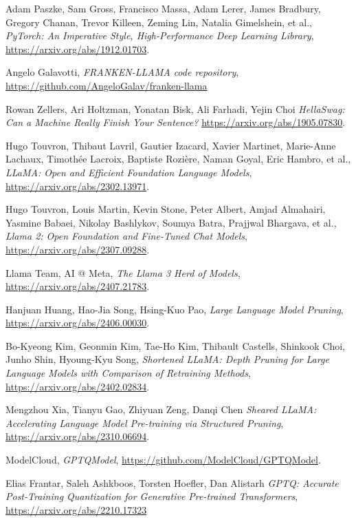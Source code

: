 \begin{thebibliography}{9}
	Adam Paszke, Sam Gross, Francisco Massa, Adam Lerer, James Bradbury, Gregory Chanan, Trevor Killeen, Zeming Lin, Natalia Gimelshein, et al.,
	\textit{PyTorch: An Imperative Style, High-Performance Deep Learning Library},
	\url{https://arxiv.org/abs/1912.01703}.

	Angelo Galavotti,
	\textit{FRANKEN-LLAMA code repository},
	\url{https://github.com/AngeloGalav/franken-llama}

	Rowan Zellers, Ari Holtzman, Yonatan Bisk, Ali Farhadi, Yejin Choi
	\textit{HellaSwag: Can a Machine Really Finish Your Sentence?}
	\url{https://arxiv.org/abs/1905.07830}.

	Hugo Touvron, Thibaut Lavril, Gautier Izacard, Xavier Martinet, Marie-Anne Lachaux, Timothée Lacroix, Baptiste Rozière, Naman Goyal, Eric Hambro, et al.,
	\textit{LLaMA: Open and Efficient Foundation Language Models},
	\url{https://arxiv.org/abs/2302.13971}.

	Hugo Touvron, Louis Martin, Kevin Stone, Peter Albert, Amjad Almahairi, Yasmine Babaei, Nikolay Bashlykov, Soumya Batra, Prajjwal Bhargava, et al.,
	\textit{Llama 2: Open Foundation and Fine-Tuned Chat Models},
	\url{https://arxiv.org/abs/2307.09288}.

	Llama Team, AI @ Meta,
	\textit{The Llama 3 Herd of Models},
	\url{https://arxiv.org/abs/2407.21783}.

	Hanjuan Huang, Hao-Jia Song, Hsing-Kuo Pao,
	\textit{Large Language Model Pruning},
	\url{https://arxiv.org/abs/2406.00030}.

	Bo-Kyeong Kim, Geonmin Kim, Tae-Ho Kim, Thibault Castells, Shinkook Choi, Junho Shin, Hyoung-Kyu Song,
	\textit{Shortened LLaMA: Depth Pruning for Large Language Models with Comparison of Retraining Methods},
	\url{https://arxiv.org/abs/2402.02834}.

	Mengzhou Xia, Tianyu Gao, Zhiyuan Zeng, Danqi Chen
	\textit{Sheared LLaMA: Accelerating Language Model Pre-training via Structured Pruning},
	\url{https://arxiv.org/abs/2310.06694}.

	ModelCloud,
	\textit{GPTQModel},
	\url{https://github.com/ModelCloud/GPTQModel}.

	Elias Frantar, Saleh Ashkboos, Torsten Hoefler, Dan Alistarh
	\textit{GPTQ: Accurate Post-Training Quantization for Generative Pre-trained Transformers},
	\url{https://arxiv.org/abs/2210.17323}


\end{thebibliography}
